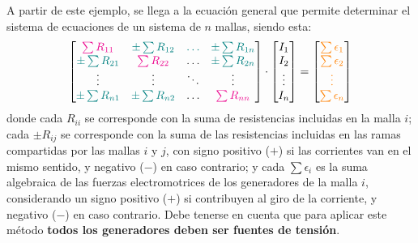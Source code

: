\documentclass[11pt]{book} %
\numberwithin{dummy}{section}
\theoremstyle{ocrenumbox}
\theoremstyle{blacknumex}
\theoremstyle{blacknumbox}
\theoremstyle{ocrenum}
\newlength\esp
\begin{document}
	A partir de este ejemplo, se llega a la ecuación general que permite determinar el sistema de ecuaciones de un sistema de $n$ mallas, siendo esta: 
	\begin{equation*}
		\begin{bmatrix}
			{\color{magenta}\sum R_{11}} &  {\color{teal}\pm\sum R_{12}} & {\color{teal}{\dots}} & {\color{teal}\pm\sum R_{1n}} \\
			{\color{teal}\pm\sum R_{21}} & {\color{magenta}\sum R_{22}} & {{\dots}} & {\color{teal}\pm\sum R_{2n}} \\
			{\vdots} & {\vdots} &  {\ddots} & \vdots\\
			{\color{teal}\pm\sum R_{n1}} & {\color{teal}\pm\sum R_{n2}} & \dots & {\color{magenta}\sum R_{nn}}
		\end{bmatrix} \cdot 
		\begin{bmatrix}
			I_1\\
			I_2\\
			\vdots\\
			I_n
		\end{bmatrix} = %
		\begin{bmatrix}
			{\color{orange}\sum\epsilon_1}\\
			{\color{orange}\sum\epsilon_2}\\
			{\color{orange}\vdots}\\
			{\color{orange}\sum\epsilon_n}
		\end{bmatrix}
	\end{equation*}
	donde cada {\color{magenta}$R_{ii}$} se corresponde con la suma de resistencias incluidas en la malla $i$; cada {\color{teal}$\pm R_{ij}$} se corresponde con la suma de las resistencias incluidas en las ramas compartidas por las mallas $i$ y $j$, con signo positivo ($+$) si las corrientes van en el mismo sentido, y negativo ($-$) en caso contrario; y cada {\color{orange} $\sum \epsilon_i$} es la suma algebraica de las fuerzas electromotrices de los generadores de la malla $i$, considerando un signo positivo ($+$) si contribuyen al giro de la corriente, y negativo ($-$) en caso contrario. Debe tenerse en cuenta que para aplicar este método \textbf{todos los generadores deben ser fuentes de tensión}. 
	
\end{document}
